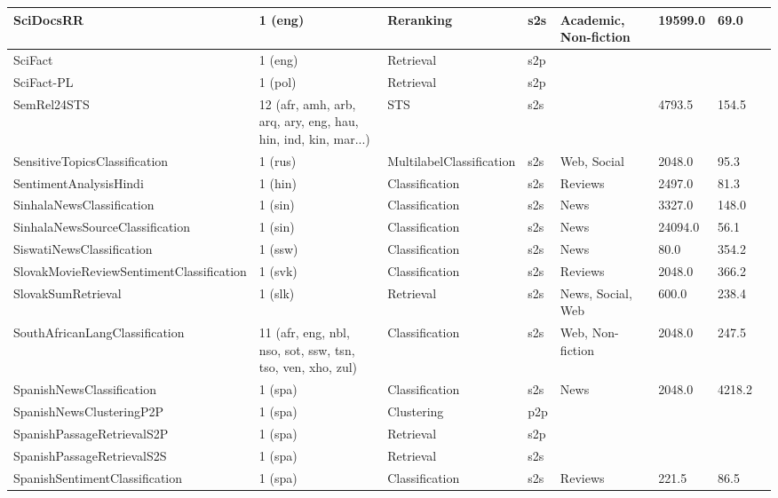 \begin{longtable}{L{5.0cm}|L{1.5cm}L{1.4cm}L{1.4cm}L{1.4cm}L{1.4cm}L{1.0cm}L{1.0cm}}
 \hline 
SciDocsRR \cite{cohan-etal-2020-specter} & 1 (eng) & Reranking & s2s & Academic, Non-fiction & 19599.0 & 69.0 \\
 \hline 
SciFact \cite{specter2020cohan} & 1 (eng) & Retrieval & s2p &  &  &  \\
 \hline 
SciFact-PL \cite{wojtasik2024beirpl} & 1 (pol) & Retrieval & s2p &  &  &  \\
 \hline 
SemRel24STS \cite{ousidhoum2024semrel2024} & 12 (afr, amh, arb, arq, ary, eng, hau, hin, ind, kin, mar...) & STS & s2s &  & 4793.5 & 154.5 \\
 \hline 
SensitiveTopicsClassification \cite{babakov-etal-2021-detecting} & 1 (rus) & MultilabelClassification & s2s & Web, Social & 2048.0 & 95.3 \\
 \hline 
SentimentAnalysisHindi \cite{OdiaGenAI} & 1 (hin) & Classification & s2s & Reviews & 2497.0 & 81.3 \\
 \hline 
SinhalaNewsClassification \cite{deSilva2015} & 1 (sin) & Classification & s2s & News & 3327.0 & 148.0 \\
 \hline 
SinhalaNewsSourceClassification \cite{dhananjaya2022} & 1 (sin) & Classification & s2s & News & 24094.0 & 56.1 \\
 \hline 
SiswatiNewsClassification \cite{Madodonga_Marivate_Adendorff_2023} & 1 (ssw) & Classification & s2s & News & 80.0 & 354.2 \\
 \hline 
SlovakMovieReviewSentimentClassification \cite{vstefanik2023resources} & 1 (svk) & Classification & s2s & Reviews & 2048.0 & 366.2 \\
 \hline 
SlovakSumRetrieval \cite{OndrejowaSlovakSum24} & 1 (slk) & Retrieval & s2s & News, Social, Web & 600.0 & 238.4 \\
 \hline 
SouthAfricanLangClassification \cite{south-african-language-identification} & 11 (afr, eng, nbl, nso, sot, ssw, tsn, tso, ven, xho, zul) & Classification & s2s & Web, Non-fiction & 2048.0 & 247.5 \\
 \hline 
SpanishNewsClassification  & 1 (spa) & Classification & s2s & News & 2048.0 & 4218.2 \\
 \hline 
SpanishNewsClusteringP2P  & 1 (spa) & Clustering & p2p &  &  &  \\
 \hline 
SpanishPassageRetrievalS2P \cite{10.1007/978-3-030-15719-7_19} & 1 (spa) & Retrieval & s2p &  &  &  \\
 \hline 
SpanishPassageRetrievalS2S \cite{10.1007/978-3-030-15719-7_19} & 1 (spa) & Retrieval & s2s &  &  &  \\
 \hline 
SpanishSentimentClassification \cite{mollanorozy-etal-2023-cross} & 1 (spa) & Classification & s2s & Reviews & 221.5 & 86.5 \\

\end{longtable}
